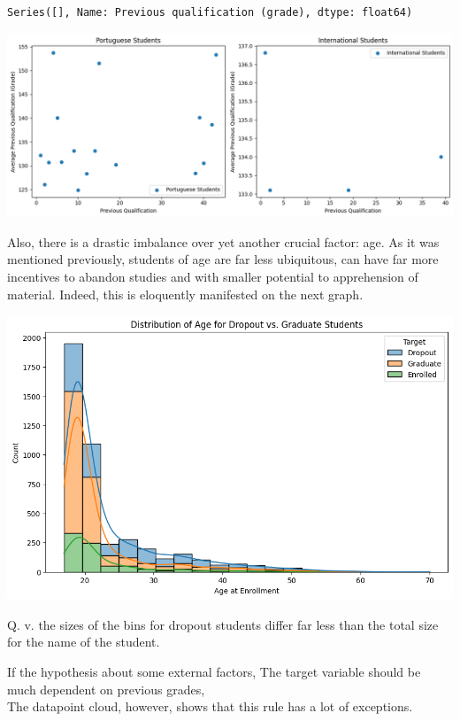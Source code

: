 \documentclass[
  letterpaper,
  DIV=11,
  numbers=noendperiod]{scrartcl}
\begin{document}
\begin{verbatim}
Series([], Name: Previous qualification (grade), dtype: float64)
\end{verbatim}

\includegraphics{report_AzadhdhinNedalYunisAlFraijat_files/figure-pdf/cell-17-output-1.png}

Also, there is a drastic imbalance over yet another crucial factor: age.
As it was mentioned previously, students of age are far less ubiquitous,
can have far more incentives to abandon studies and with smaller
potential to apprehension of material. Indeed, this is eloquently
manifested on the next graph.

\includegraphics{report_AzadhdhinNedalYunisAlFraijat_files/figure-pdf/cell-18-output-1.png}

Q. v. the sizes of the bins for dropout students differ far less than
the total size for the name of the student.

If the hypothesis about some external factors, The target variable
should be much dependent on previous grades,\\
The datapoint cloud, however, shows that this rule has a lot of
exceptions.
\end{document}
